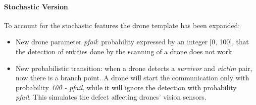 \paragraph{Stochastic Version}
To account for the stochastic features the drone template has been expanded:
\begin{itemize}
	\item New drone parameter \textit{pfail}: probability expressed by an integer [0, 100], that the detection of entities done by the scanning of a drone does not work.
	\item New probabilistic transition: when a drone detects a \textit{survivor} and \textit{victim} pair, now there is a branch point. A drone will start the communication only with probability \textit{100 - pfail}, while it will ignore the detection with probability \textit{pfail}. This simulates the defect affecting drones' vision sensors.
\end{itemize}
